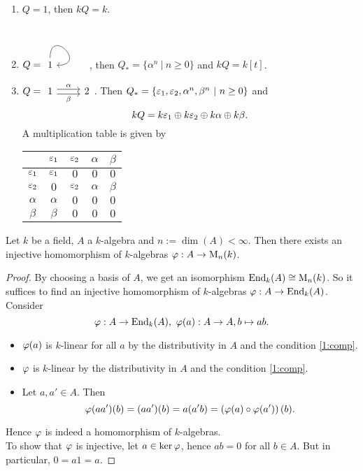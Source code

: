 \begin{bsp}
	\begin{enumerate}
		\item $Q=1$, then $kQ=k$.
		\item $Q=\begin{tikzcd}1\arrow[out=90,in=0,loop]\end{tikzcd}$, then $Q_{\ast}=\{\alpha^n~|~n\geq 0\}$ and $kQ = k[t]$.
		\item $Q =\begin{tikzcd}1\ar[shift left]{r}{\alpha}\ar[shift right,swap]{r}{\beta}&2\end{tikzcd}$. Then
		$Q_{\ast} = \{\varepsilon_1,\varepsilon_2,\alpha^n,\beta^n~|~n\geq 0\}$ and
		\[
		kQ = k\varepsilon_1\oplus k\varepsilon_2\oplus k\alpha \oplus k\beta.
		\]
		A multiplication table is given by\\
		\begin{center}
			\begin{tabular}{|c|c|c|c|c|}
				\hline
				&$\varepsilon_1$&$\varepsilon_2$&$\alpha$&$\beta$\\ \hline
				$\varepsilon_1$&$\varepsilon_1$&$0$&$0$&$0$\\ \hline
				$\varepsilon_2$&$0$&$\varepsilon_2$&$\alpha$&$\beta$\\ \hline
				$\alpha$&$\alpha$&$0$&$0$&$0$\\ \hline
				$\beta$&$\beta$&$0$&$0$&$0$\\ \hline
			\end{tabular}
		\end{center}
	\end{enumerate}
\end{bsp}
\begin{lem}
	Let $k$ be a field, $A$ a $k$-algebra and $n:=\dim(A)<\infty$. Then there exists an injective homomorphism of $k$-algebras $\varphi:A\to \operatorname{M}_n(k)$.
\end{lem}
\begin{proof}
	By choosing a basis of $A$, we get an isomorphism $\operatorname{End}_k(A)\cong \operatorname{M}_n(k)$. So it suffices to find an injective homomorphism of $k$-algebras $\varphi:A\to \operatorname{End}_k(A)$.\\
	Consider
	\[
	\varphi:A\to \operatorname{End}_k(A),~\varphi(a):A\to A,b\mapsto ab.
	\]
	\begin{itemize}
		\item $\varphi(a)$ is $k$-linear for all $a$ by the distributivity in $A$ and the condition \eqref{1:comp}.
		\item $\varphi$ is $k$-linear by the distributivity in $A$ and the condition \eqref{1:comp}.
		\item Let $a,a'\in A$. Then
		\[
		\varphi(aa')(b)=(aa')(b)=a(a'b)=\left(\varphi(a)\circ\varphi(a')\right)(b).
		\]
	\end{itemize}
	Hence $\varphi$ is indeed a homomorphism of $k$-algebras.\\
	To show that $\varphi$ is injective, let $a\in \ker \varphi$, hence $ab=0$ for all $b\in A$. But in particular, $0=a1=a$.
	\end{proof}
\lec
